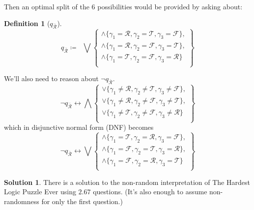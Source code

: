 \documentclass[twoside,twocolumn,a4paper,11pt]{article}
\theoremstyle{definition}
\newtheorem{defn}[theorem]{Definition}
\newtheorem{solution}[theorem]{Solution}
\begin{document}
Then
an optimal split of the $6$ possibilities would be provided 
by asking about:
\begin{defn}[$q_{\bar{\mathcal{R}}}$]
\label{def:qRBar}
\begin{equation}
\label{eq:qRBar}
q_{\bar{\mathcal{R}}}\coloneqq\;\;
\bigvee
 \left\lbrace
  \begin{matrix}
   \land\{\gamma_1=\mathcal{R},\gamma_2=\mathcal{T},\gamma_3=\mathcal{F}\},\\
   \land\{\gamma_1=\mathcal{R},\gamma_2=\mathcal{F},\gamma_3=\mathcal{T}\},\\
   \land\{\gamma_1=\mathcal{T},\gamma_2=\mathcal{F},\gamma_3=\mathcal{R}\}\;\\
  \end{matrix}
 \right\rbrace 
\end{equation}
\end{defn}
We'll also need to reason about $\neg q_{\bar{\mathcal{R}}}$.
\begin{equation}
\neg q_{\bar{\mathcal{R}}} \leftrightarrow
\bigwedge
 \left\lbrace
  \begin{matrix}
   \lor\{\gamma_1\neq\mathcal{R},\gamma_2\neq\mathcal{T},\gamma_3\neq\mathcal{F}\},\\
   \lor\{\gamma_1\neq\mathcal{R},\gamma_2\neq\mathcal{F},\gamma_3\neq\mathcal{T}\},\\
   \lor\{\gamma_1\neq\mathcal{T},\gamma_2\neq\mathcal{F},\gamma_3\neq\mathcal{R}\}\;\\
  \end{matrix}
 \right\rbrace 
\end{equation}
which in disjunctive normal form (DNF) becomes
\begin{equation}
\label{eq:notqRBar}
\neg q_{\bar{\mathcal{R}}} \leftrightarrow
\bigvee
 \left\lbrace
  \begin{matrix}
   \land\{\gamma_1=\mathcal{T},\gamma_2=\mathcal{R},\gamma_3=\mathcal{F}\},\\
   \land\{\gamma_1=\mathcal{F},\gamma_2=\mathcal{T},\gamma_3=\mathcal{R}\},\\
   \land\{\gamma_1=\mathcal{F},\gamma_2=\mathcal{R},\gamma_3=\mathcal{T}\}\;\\
  \end{matrix}
 \right\rbrace 
\end{equation}
\begin{solution}
\label{solution:nonR}
There is a solution to the non-random interpretation of The Hardest Logic Puzzle Ever
using $2.67$ questions.
(It's also enough to assume non-randomness for only the first question.)
\end{solution}
\end{document}
